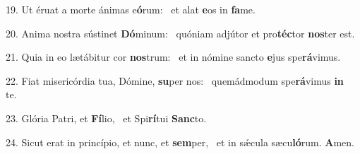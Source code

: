 19. Ut éruat a morte ánimas e\textbf{ó}rum: \ast\  et alat \textbf{e}os in \textbf{fa}me.\

20. Anima nostra sústinet \textbf{Dó}minum: \ast\  quóniam adjútor et pro\textbf{téc}tor \textbf{nos}ter est.\

21. Quia in eo lætábitur cor \textbf{nos}trum: \ast\  et in nómine sancto \textbf{e}jus spe\textbf{rá}vimus.\

22. Fiat misericórdia tua, Dómine, \textbf{su}per nos: \ast\  quemádmodum spe\textbf{rá}vimus \textbf{in} te.\

23. Glória Patri, et \textbf{Fí}lio, \ast\  et Spi\textbf{rí}tui \textbf{Sanc}to.\

24. Sicut erat in princípio, et nunc, et \textbf{sem}per, \ast\  et in sǽcula sæcu\textbf{ló}rum. \textbf{A}men.\

